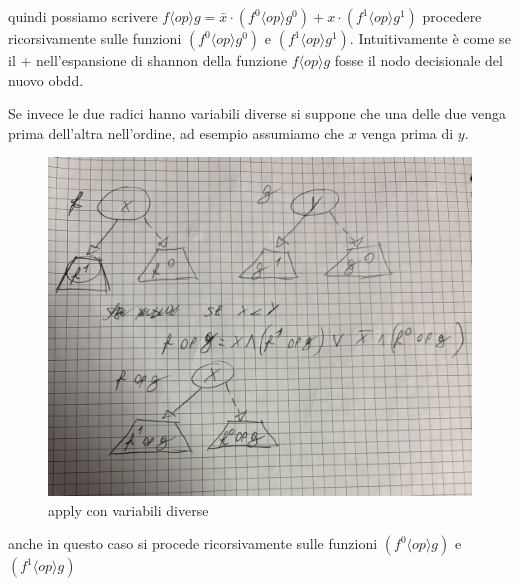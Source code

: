 \documentclass{article}
\begin{document}
quindi possiamo scrivere $f \langle op \rangle g = \bar{x} \cdot (f^0 \langle op \rangle g^0) + x \cdot (f^1 \langle op \rangle g^1)$  procedere ricorsivamente sulle funzioni $(f^0 \langle op \rangle g^0)$ e $(f^1 \langle op \rangle g^1)$. Intuitivamente è come se il + nell'espansione di shannon della funzione $f \langle op \rangle g$ fosse il nodo decisionale del nuovo obdd.

Se invece le due radici hanno variabili diverse si suppone che una delle due venga prima dell'altra nell'ordine, ad esempio assumiamo che $x$ venga prima di $y$.
\vspace{-10pt}
\begin{figure}[H]
    \centering
    \includegraphics[max width=\linewidth, max height=0.35\textheight, keepaspectratio]{Resources/applyNoSameLabel.jpg}
    \caption{apply con variabili diverse}
    \label{fig:apply2}
\end{figure}

anche in questo caso si procede ricorsivamente sulle funzioni $(f^0 \langle op \rangle g)$ e $(f^1 \langle op \rangle g)$
\end{document}

